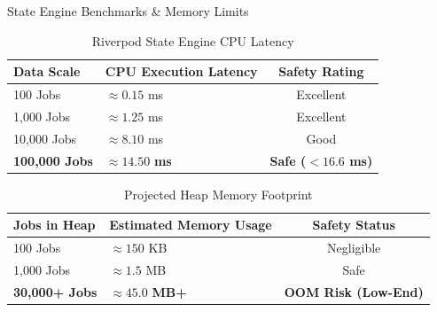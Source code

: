 \documentclass[10pt]{beamer}
\begin{document}
\begin{frame}{State Engine Benchmarks \& Memory Limits}
    \begin{table}[htbp]
        \centering
        \caption{Riverpod State Engine CPU Latency}
        \begin{tabular}{llc}
            \toprule
            \textbf{Data Scale} & \textbf{CPU Execution Latency} & \textbf{Safety Rating} \\
            \midrule
            100 Jobs & $\approx 0.15$ ms & Excellent \\
            1,000 Jobs & $\approx 1.25$ ms & Excellent \\
            10,000 Jobs & $\approx 8.10$ ms & Good \\
            \textbf{100,000 Jobs} & $\mathbf{\approx 14.50}$ \textbf{ms} & \textbf{Safe ($<16.6$ ms)} \\
            \bottomrule
        \end{tabular}
    \end{table}
    \begin{table}[htbp]
        \centering
        \caption{Projected Heap Memory Footprint}
        \begin{tabular}{llc}
            \toprule
            \textbf{Jobs in Heap} & \textbf{Estimated Memory Usage} & \textbf{Safety Status} \\
            \midrule
            100 Jobs & $\approx 150$ KB & Negligible \\
            1,000 Jobs & $\approx 1.5$ MB & Safe \\
            \textbf{30,000+ Jobs} & $\mathbf{\approx 45.0}$ \textbf{MB+} & \textbf{OOM Risk (Low-End)} \\
            \bottomrule
        \end{tabular}
    \end{table}
\end{frame}
\end{document}
